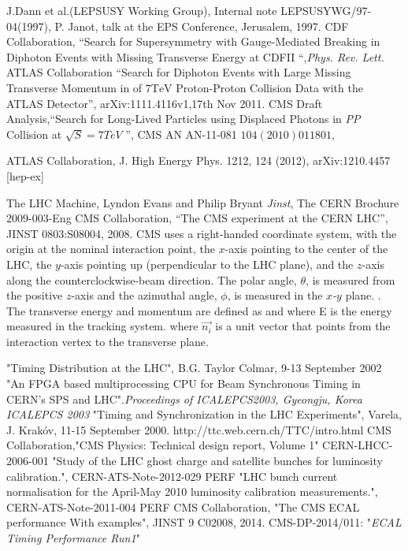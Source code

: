 \begin{thebibliography}{9}
J.Dann et al.(LEPSUSY Working Group), Internal note LEPSUSYWG/97-04(1997), P. Janot, talk at the EPS Conference, Jerusalem, 1997.
CDF Collaboration, ``Search for Supersymmetry with Gauge-Mediated Breaking in Diphoton Events with Missing Transverse Energy at CDFII ``,\emph{Phys. Rev. Lett.}
 ATLAS Collaboration ``Search for Diphoton Events with Large Missing Transverse Momentum in  of $\text{7TeV}$ Proton-Proton Collision Data with the ATLAS Detector'', arXiv:1111.4116v1,17th Nov 2011. 
CMS Draft Analysis,``Search for Long-Lived Particles using Displaced Photons in \emph{PP} Collision at $\sqrt{S}=7TeV$ '', CMS AN AN-11-081 \emph{$104(2010) 011801,$}

ATLAS Collaboration, J. High Energy Phys. 1212, 124
(2012), arXiv:1210.4457 [hep-ex]

 The LHC Machine, Lyndon Evans and Philip Bryant \textit{Jinst},
 The CERN Brochure 2009-003-Eng
CMS Collaboration, ``The CMS experiment at the CERN LHC'', JINST 0803:S08004, 2008.
CMS uses a right-handed coordinate system, with the origin at the nominal interaction point, the \emph{$x$}-axis pointing to the center of the LHC, 
the \emph{$y$}-axis pointing up (perpendicular to the LHC plane), and the \emph{$z$}-axis along the counterclockwise-beam direction. The polar angle, $\theta$, 
is measured from the positive \emph{$z$}-axis and the azimuthal angle, $\phi$, is measured in the \emph{$x$-$y$} plane. . 
The transverse energy and momentum are defined as  and  where \textsc{E} is the energy measured in the 
tracking system. where $\vec{n_{i}}$ is a unit vector that points from the interaction vertex to the transverse plane.

 "Timing Distribution at the LHC",  B.G. Taylor Colmar, 9-13 September 2002
 "An FPGA based multiprocessing CPU for Beam
Synchronous Timing in CERN’s SPS and LHC".\emph{Proceedings of ICALEPCS2003, Gyeongju, Korea
ICALEPCS 2003}
 "Timing and Synchronization in the LHC Experiments", Varela, J. Krakóv, 11-15 September 2000.
 http://ttc.web.cern.ch/TTC/intro.html
CMS Collaboration,"CMS Physics: Technical design report, Volume 1" CERN-LHCC-2006-001
 "Study of the LHC ghost charge and
satellite bunches for luminosity calibration.", CERN-ATS-Note-2012-029 PERF
 "LHC bunch current normalisation for the April-May 2010 luminosity calibration measurements.", CERN-ATS-Note-2011-004 PERF
CMS Collaboration, "The CMS ECAL performance With examples", JINST 9 C02008, 2014.
 CMS-DP-2014/011: "\textit{ECAL Timing Performance Run1}"



\end{thebibliography}
